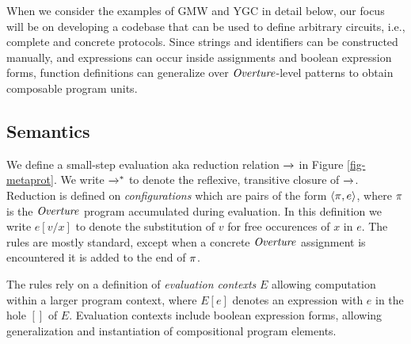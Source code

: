 When we consider the examples of GMW and YGC in detail below, our
focus will be on developing a codebase that can be used to define
arbitrary circuits, i.e., complete and concrete protocols. Since
strings and identifiers can be constructed manually, and expressions
can occur inside assignments and boolean expression forms, function
definitions can generalize over $\mathit{Overture}$-level patterns to obtain
composable program units.

\metaprotfig

\subsection{Semantics}

We define a small-step evaluation aka reduction relation $\xrightarrow{}$ in
Figure \ref{fig-metaprot}.  We write $\xrightarrow{}^{*}$ to denote the
reflexive, transitive closure of $\xrightarrow{}$. Reduction is defined on
\emph{configurations} which are pairs of the form $\langle \pi,e \rangle$,
where $\pi$ is the $\mathit{Overture}$ program accumulated during evaluation.
In this definition we write $e[v/x]$ to denote the substitution of $v$
for free occurences of $x$ in $e$. The rules are mostly standard,
except when a concrete $\mathit{Overture}$ assignment is encountered it is added
to the end of $\pi$.

The rules rely on a definition of \emph{evaluation contexts} $E$
allowing computation within a larger program context, where $E[e]$
denotes an expression with $e$ in the hole $[]$ of $E$. Evaluation
contexts include boolean expression forms, allowing generalization
and instantiation of compositional program elements.
